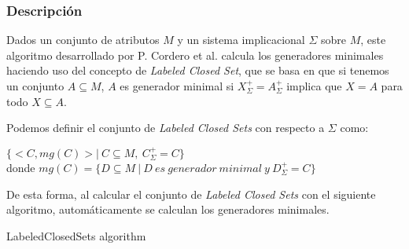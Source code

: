 \subsubsection{Descripci\'on} 

Dados un conjunto de atributos \(M\) y un sistema implicacional \(\Sigma\) sobre \(M\), este algoritmo desarrollado por P. Cordero et al. \cite{LCS} calcula los generadores minimales haciendo uso del concepto de \textit{Labeled Closed Set}, que se basa en que si tenemos un conjunto \(A \subseteq M\), \(A\) es generador minimal si \(X^+_{\Sigma} = A^+_{\Sigma}\) implica que \(X = A\) para todo  \(X \subseteq A\). 

Podemos definir el conjunto de \textit{Labeled Closed Sets} con respecto a \(\Sigma\) como:
\begin{center}
    \(\{<C,mg(C)> | \ C \subseteq M, \ C^+_{\Sigma} = C \}\)\\
    donde \(mg(C) = \{D \subseteq M \ | \ D \ es \ generador \ minimal \ y \ D^+_{\Sigma} = C \}\)
\end{center}

De esta forma, al calcular el conjunto de \textit{Labeled Closed Sets} con el siguiente algoritmo, autom\'aticamente se calculan los generadores minimales.\\

\IncMargin{1em}
\begin{algorithm}[H]
    \SetAlgoLined
    \DontPrintSemicolon
    \caption{LabeledClosedSets algorithm}\label{alg:3}
\end{algorithm}\DecMargin{1em}
\newpage

